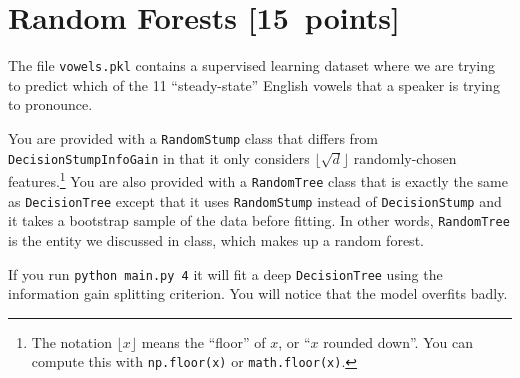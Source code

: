 \documentclass{article}
\newcommand\pts[1]{\textcolor{pointscolour}{[#1~points]}}
\begin{document}
    \section{Random Forests \pts{15}}

    The file \texttt{vowels.pkl} contains a supervised learning dataset where we are trying to predict which of the 11 ``steady-state'' English vowels that a speaker is trying to pronounce.

    You are provided with a \texttt{RandomStump} class that differs from
    \texttt{DecisionStumpInfoGain} in that
    it only considers $\lfloor \sqrt{d} \rfloor$ randomly-chosen features.\footnote{The notation $\lfloor x\rfloor$ means the ``floor'' of $x$, or ``$x$ rounded down''. You can compute this with \texttt{np.floor(x)} or \texttt{math.floor(x)}.}
    You are also provided with a \texttt{RandomTree} class that is exactly the same as
    \texttt{DecisionTree} except that it uses \texttt{RandomStump} instead of
    \texttt{DecisionStump} and it takes a bootstrap sample of the data before fitting.
    In other words, \texttt{RandomTree} is the entity we discussed in class, which
    makes up a random forest.

    If you run \texttt{python main.py 4} it will fit a deep \texttt{DecisionTree}
    using the information gain splitting criterion. You will notice that the model overfits badly.
\end{document}
